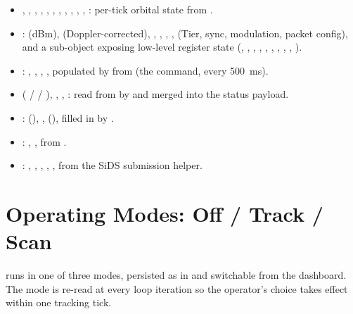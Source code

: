 \begin{itemize}
    \item {}, , , , , , , , , , , : per-tick orbital state from .
    \item {}:  (dBm),  (Doppler-corrected), , , , ,  (Tier, sync, modulation, packet config), and a  sub-object exposing low-level register state (, , , , , , , , , ).
    \item {}: , , , , populated by  from  (the  command, every 500~ms).
    \item {} ( /  / ), , , : read from  by  and merged into the status payload.
    \item {}:  (), ,  (), filled in by .
    \item {}: , ,  from .
    \item {}: , , , , ,  from the SiDS submission helper.
\end{itemize}

\section{Operating Modes: Off / Track / Scan}
\label{sec:operating-modes}

 runs in one of three modes, persisted as  in  and switchable from the dashboard. The mode is re-read at every loop iteration so the operator's choice takes effect within one tracking tick.

